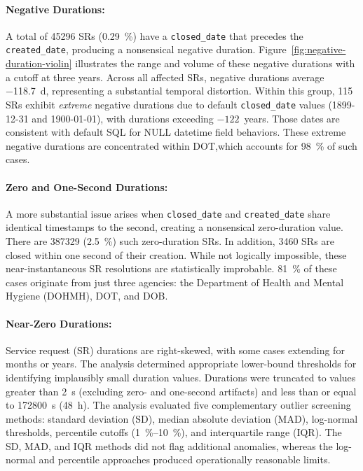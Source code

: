 \documentclass[linenumber]{jdsart}
\begin{document}
\paragraph{Negative Durations:}
\label{par:negativedurations}
A total of \num{45296} SRs
(\SI[round-mode=places, round-precision=2]{0.29}{\percent})
have a \texttt{closed\_date} that precedes the
\texttt{created\_date}, producing a nonsensical negative duration.
Figure~\ref{fig:negative-duration-violin} illustrates the
range and volume of these negative durations with a cutoff at
three years. Across all affected SRs, negative durations
average \SI[round-mode=places, round-precision=1]{-118.7}{\day},
representing a substantial temporal distortion.
Within this group, \num{115} SRs exhibit \emph{extreme}
negative durations due to default \texttt{closed\_date} values
(1899-12-31 and 1900-01-01), with durations exceeding
$-122$~years. Those dates are consistent with default SQL for NULL datetime 
field behaviors. These extreme negative durations are concentrated 
within DOT,which accounts for \SI{98}{\percent} of such cases.


\paragraph{Zero and One-Second Durations:}
A more substantial issue arises when \texttt{closed\_date} and
\texttt{created\_date} share identical timestamps to the second,
creating a nonsensical zero-duration value. There are \num{387329}
(\SI{2.5}{\percent}) such zero-duration SRs. In addition, \num{3460} SRs 
are closed within one second of their creation. While not logically 
impossible, these near-instantaneous SR resolutions are statistically improbable.
\SI{81}{\percent} of these cases originate from just three agencies:
the Department of Health and Mental Hygiene (DOHMH),
DOT, and DOB.

\paragraph{Near-Zero Durations:}
\label{par:suspiciousdurations}
Service request (\textsc{SR}) durations are right-skewed,
with some cases extending for months or years.
The analysis determined appropriate lower-bound thresholds
for identifying implausibly small duration values.
Durations were truncated to values greater than
\SI{2}{\second} (excluding zero- and one-second artifacts)
and less than or equal to \SI{172800}{\second}
(\SI{48}{\hour}). The analysis evaluated five complementary outlier screening methods:
standard deviation (SD), median absolute deviation (MAD),
log-normal thresholds, percentile cutoffs
(\SIrange{1}{10}{\percent}), and interquartile range (IQR).
The SD, MAD, and IQR methods did not flag additional anomalies,
whereas the log-normal and percentile approaches produced
operationally reasonable limits.
\end{document}

